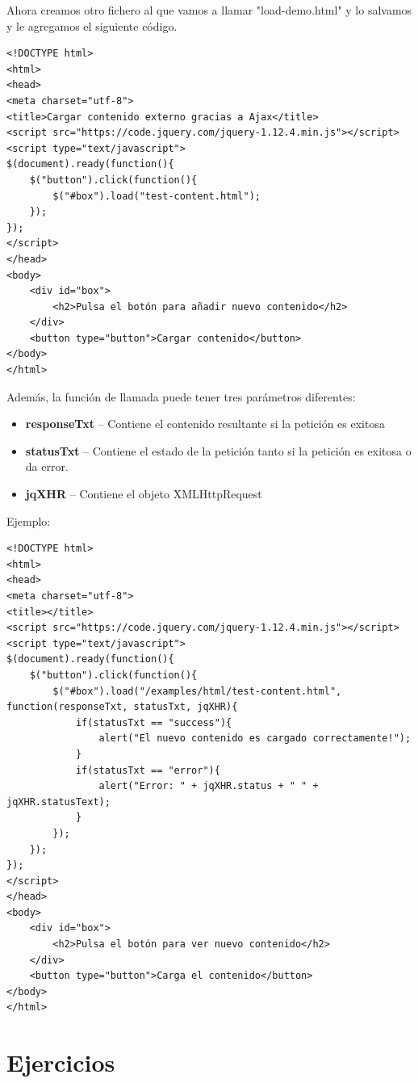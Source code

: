 \documentclass[11pt]{article}
\begin{document}
Ahora creamos otro fichero al que vamos a llamar "load-demo.html" y lo salvamos y le agregamos el siguiente código.

\begin{verbatim}
<!DOCTYPE html>
<html>
<head>
<meta charset="utf-8">
<title>Cargar contenido externo gracias a Ajax</title>
<script src="https://code.jquery.com/jquery-1.12.4.min.js"></script>
<script type="text/javascript">
$(document).ready(function(){
    $("button").click(function(){
        $("#box").load("test-content.html");
    });
});
</script>
</head>
<body>
    <div id="box">
        <h2>Pulsa el botón para añadir nuevo contenido</h2>
    </div>
    <button type="button">Cargar contenido</button>
</body>
</html>                                		
\end{verbatim}


Además, la función de llamada puede tener tres parámetros diferentes:

\begin{itemize}
\item \textbf{responseTxt} -- Contiene el contenido resultante si la petición es exitosa
\item \textbf{statusTxt} -- Contiene el estado de la petición tanto si la petición es exitosa o da error.
\item \textbf{jqXHR} -- Contiene el objeto XMLHttpRequest
\end{itemize}

Ejemplo:

\begin{verbatim}
<!DOCTYPE html>
<html>
<head>
<meta charset="utf-8">
<title></title>
<script src="https://code.jquery.com/jquery-1.12.4.min.js"></script>
<script type="text/javascript">
$(document).ready(function(){
    $("button").click(function(){
        $("#box").load("/examples/html/test-content.html", function(responseTxt, statusTxt, jqXHR){
            if(statusTxt == "success"){
                alert("El nuevo contenido es cargado correctamente!");
            }
            if(statusTxt == "error"){
                alert("Error: " + jqXHR.status + " " + jqXHR.statusText);
            }
        });
    });
});
</script>
</head>
<body>
    <div id="box">
        <h2>Pulsa el botón para ver nuevo contenido</h2>
    </div>
    <button type="button">Carga el contenido</button>
</body>
</html>                                		
\end{verbatim}

\section*{Ejercicios}
\label{sec:org525f719}
\end{document}
